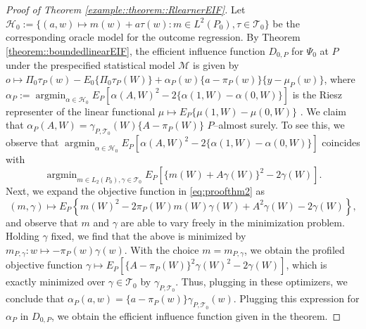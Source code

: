 \documentclass[11pt]{article}
\DeclareMathOperator*{\argmin}{argmin}
\theoremstyle{definition}
\begin{document}
\begin{proof}[Proof of Theorem  \ref{example::theorem::RlearnerEIF}]
    
    Let $\mathcal{H}_0 := \{(a,w) \mapsto m(w) + a \tau(w): m \in L^2(P_0), \tau \in \mathcal{T}_0\}$ be the corresponding oracle model for the outcome regression. By Theorem \ref{theorem::boundedlinearEIF}, the efficient influence function $D_{0,P}$ for $\Psi_0$ at $P$ under the prespecified statistical model $\mathcal{M}$ is given by $o\mapsto \Pi_0 \tau_P(w) - E_0\{\Pi_0 \tau_P(W)\} + \alpha_P(w)\{a - \pi_P(w)\}\{y - \mu_P(w)\}$, where $\alpha_P := \argmin_{\alpha \in \mathcal{H}_0} E_P\left[\alpha(A,W)^2 - 2\{\alpha(1,W)-\alpha(0,W)\}\right]$ is the Riesz representer of the linear functional $\mu \mapsto E_P\{\mu(1,W) - \mu(0,W)\}$ \citep{chernoRegRiesz, chernozhukov2018auto}. We claim that $\alpha_P(A,W) = \gamma_{P, \mathcal{T}_0}(W)\{A-\pi_P(W)\}$  $P$--almost surely. To see this, we observe that $\argmin_{\alpha \in \mathcal{H}_0} E_P\left[\alpha(A,W)^2 - 2\{\alpha(1,W)-\alpha(0,W)\}\right]$ coincides with 
    \begin{equation}\argmin_{m \in L_2(P_0),\gamma \in \mathcal{T}_0} E_P\left[\{m(W) + A \gamma(W) \}^2 - 2\gamma(W)\right].\label{eq:proofthm2}\end{equation} Next, we expand the objective function in \eqref{eq:proofthm2} as
    $$(m,\gamma)\mapsto E_P\left\{m(W)^2 - 2\pi_P(W)m(W)\gamma(W) + A^2 \gamma(W) - 2\gamma(W)  \right\},$$
    and observe that $m$ and $\gamma$ are able to vary freely in the minimization problem. Holding $\gamma$ fixed, we find that the above is minimized by $m_{P,\gamma}:w\mapsto -\pi_P(w)\gamma(w)$. With the choice $m=m_{P,\gamma}$, we obtain the profiled objective function 
    $\gamma\mapsto E_P\left[\{A-\pi_P(W)\}^2 \gamma(W)^2 - 2\gamma(W)\right]$, which is exactly minimized  over $\gamma \in \mathcal{T}_0$ by $\gamma_{P, \mathcal{T}_0}$. Thus, plugging in these optimizers, we conclude that $\alpha_P(a,w) = \{a-\pi_P(w)\}\gamma_{P, \mathcal{T}_0}(w)$. Plugging this expression for $\alpha_P$ in $D_{0, P}$, we obtain the efficient influence function given in the theorem.\end{proof}
\end{document}
